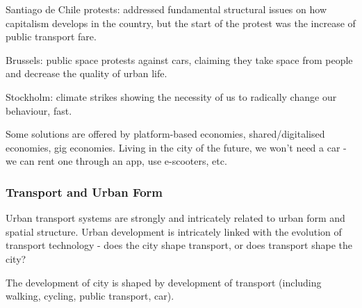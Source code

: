 \documentclass{article}
\begin{document}
Santiago de Chile protests: addressed fundamental structural issues on how capitalism develops in the country, but the start of the protest was the increase of public transport fare.

Brussels: public space protests against cars, claiming they take space from people and decrease the quality of urban life.

Stockholm: climate strikes showing the necessity of us to radically change our behaviour, fast.

Some solutions are offered by platform-based economies, shared/digitalised economies, gig economies. Living in the city of the future, we won't need a car - we can rent one through an app, use e-scooters, etc.

\subsubsection{Transport and Urban Form}

Urban transport systems are strongly and intricately related to urban form and spatial structure. Urban development is intricately linked with the evolution of transport technology - does the city shape transport, or does transport shape the city?

The development of city is shaped by development of transport (including walking, cycling, public transport, car).
\end{document}
